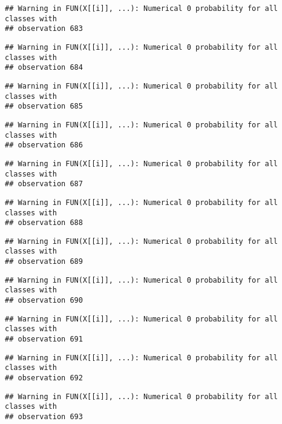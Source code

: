 \documentclass[
]{article}
\begin{document}
\begin{verbatim}
## Warning in FUN(X[[i]], ...): Numerical 0 probability for all classes with
## observation 683
\end{verbatim}

\begin{verbatim}
## Warning in FUN(X[[i]], ...): Numerical 0 probability for all classes with
## observation 684
\end{verbatim}

\begin{verbatim}
## Warning in FUN(X[[i]], ...): Numerical 0 probability for all classes with
## observation 685
\end{verbatim}

\begin{verbatim}
## Warning in FUN(X[[i]], ...): Numerical 0 probability for all classes with
## observation 686
\end{verbatim}

\begin{verbatim}
## Warning in FUN(X[[i]], ...): Numerical 0 probability for all classes with
## observation 687
\end{verbatim}

\begin{verbatim}
## Warning in FUN(X[[i]], ...): Numerical 0 probability for all classes with
## observation 688
\end{verbatim}

\begin{verbatim}
## Warning in FUN(X[[i]], ...): Numerical 0 probability for all classes with
## observation 689
\end{verbatim}

\begin{verbatim}
## Warning in FUN(X[[i]], ...): Numerical 0 probability for all classes with
## observation 690
\end{verbatim}

\begin{verbatim}
## Warning in FUN(X[[i]], ...): Numerical 0 probability for all classes with
## observation 691
\end{verbatim}

\begin{verbatim}
## Warning in FUN(X[[i]], ...): Numerical 0 probability for all classes with
## observation 692
\end{verbatim}

\begin{verbatim}
## Warning in FUN(X[[i]], ...): Numerical 0 probability for all classes with
## observation 693
\end{verbatim}
\end{document}
